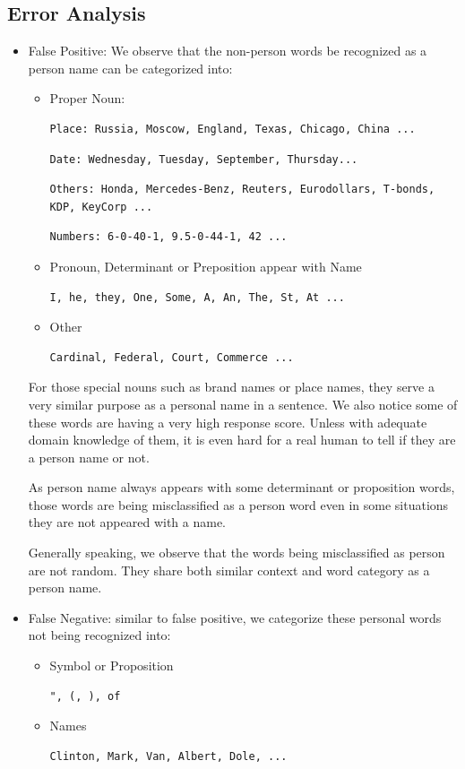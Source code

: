 \documentclass[letterpaper]{article}
\begin{document}
\subsection{Error Analysis}
\begin{itemize}
\item False Positive: We observe that the non-person words be recognized as a person name can be categorized into: \\
\begin{itemize}
\item Proper Noun:
\begin{verbatim}
Place: Russia, Moscow, England, Texas, Chicago, China ...
\end{verbatim}
\begin{verbatim}
Date: Wednesday, Tuesday, September, Thursday...
\end{verbatim}
\begin{verbatim}
Others: Honda, Mercedes-Benz, Reuters, Eurodollars, T-bonds, KDP, KeyCorp ...
\end{verbatim}
\begin{verbatim}
Numbers: 6-0-40-1, 9.5-0-44-1, 42 ...
\end{verbatim}
\item Pronoun, Determinant or Preposition appear with Name
\begin{verbatim}
I, he, they, One, Some, A, An, The, St, At ...
\end{verbatim}
\item Other
\begin{verbatim}
Cardinal, Federal, Court, Commerce ...
\end{verbatim}
\end{itemize}
For those special nouns such as brand names or place names, they serve a very similar purpose as a personal name in a sentence. We also notice some of these words are having a very high response score. Unless with adequate domain knowledge of them, it is even hard for a real human to tell if they are a person name or not.

As person name always appears with some determinant or proposition words, those words are being misclassified as a person word even in some situations they are not appeared with a name.  

Generally speaking, we observe that the words being misclassified as person are not random. They share both similar context and word category as a person name.


\item False Negative: similar to false positive, we categorize these personal words not being recognized into:
\begin{itemize}
\item Symbol or Proposition
\begin{verbatim}
", (, ), of
\end{verbatim}
\item Names
\begin{verbatim}
Clinton, Mark, Van, Albert, Dole, ...
\end{verbatim}
\end{itemize}


\end{itemize}
\end{document}
